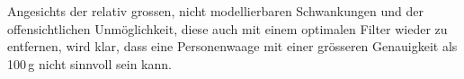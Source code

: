 \begin{diskussion}
Angesichts der relativ grossen, nicht modellierbaren Schwankungen und
der offensichtlichen Unmöglichkeit, diese auch mit einem optimalen
Filter wieder zu entfernen, wird klar, dass eine Personenwaage mit einer
grösseren Genauigkeit als 100\,g nicht sinnvoll sein kann.
\end{diskussion}



